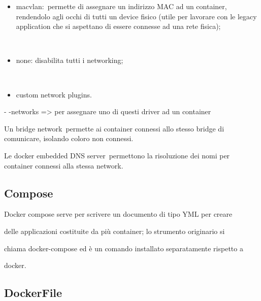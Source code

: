 \documentclass[
]{article}
\providecommand{\tightlist}{%
  \setlength{\itemsep}{0pt}\setlength{\parskip}{0pt}}
\begin{document}
{}

\begin{itemize}
\tightlist
\item
  {macvlan}{:}{~permette di assegnare un indirizzo MAC ad un container,
  rendendolo agli occhi di tutti un device fisico (utile per lavorare
  con le legacy application che si aspettano di essere connesse ad una
  rete fisica)}{;}
\end{itemize}

{~}

\begin{itemize}
\tightlist
\item
  {none}{: disabilita tutti i networking}{;}
\end{itemize}

{~}

\begin{itemize}
\tightlist
\item
  {custom network plugins}{.}
\end{itemize}

{}

{}

{- -networks =\textgreater{} per assegnare uno di questi driver ad un
container}

{}

{}

{Un }{bridge network}{~permette ai container connessi allo stesso bridge
di comunicare, isolando coloro non connessi.}

{}

{Le }{docker embedded DNS server}{~permettono la risoluzione dei nomi
per container connessi alla stessa network.}

\subsection{\texorpdfstring{{Compose}}{Compose}}\label{h.hk6jpwwyn477}

{Docker compose serve per scrivere un documento di tipo YML per creare }

{delle applicazioni costituite da più container; lo strumento originario
si }

{chiama docker-compose ed è un comando installato separatamente rispetto
a }

{docker.}

\subsection{\texorpdfstring{{DockerFile}}{DockerFile}}\label{h.3x53fpkri4bo}
\end{document}
